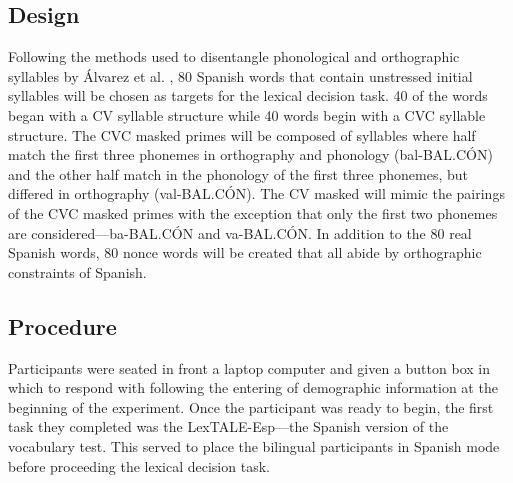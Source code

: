 \subsection{Design}

Following the methods used to disentangle phonological and orthographic syllables by Álvarez et al. \parencite*{Alvarez2004-nd}, 80 Spanish words that contain unstressed initial syllables will be chosen as targets for the lexical decision task. 40 of the words began with a CV syllable structure while 40 words begin with a CVC syllable structure. The CVC masked primes will be composed of syllables where half match the first three phonemes in orthography and phonology (bal-BAL.CÓN) and the other half match in the phonology of the first three phonemes, but differed in orthography (val-BAL.CÓN). The CV masked will mimic the pairings of the CVC masked primes with the exception that only the first two phonemes are considered—ba-BAL.CÓN and va-BAL.CÓN. In addition to the 80 real Spanish words, 80 nonce words will be created that all abide by orthographic constraints of Spanish.




\subsection{Procedure}

Participants were seated in front a laptop computer and given a button box in which to respond with following the entering of demographic information at the beginning of the experiment. Once the participant was ready to begin, the first task they completed was the LexTALE-Esp---the Spanish version of the vocabulary test. This served to place the bilingual participants in Spanish mode before proceeding the lexical decision task.

